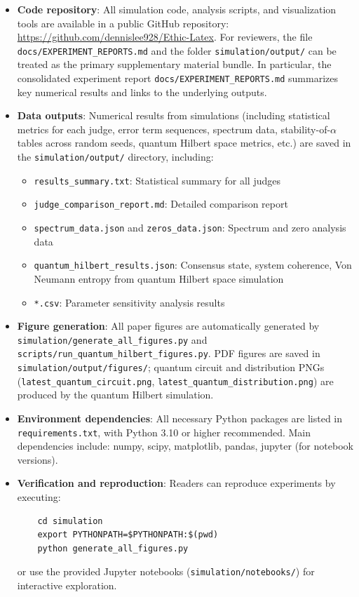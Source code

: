 \documentclass[12pt,a4paper]{article}
\theoremstyle{definition}
\theoremstyle{remark}
\begin{document}
\begin{itemize}
    \item \textbf{Code repository}: All simulation code, analysis scripts, and visualization tools are available in a public GitHub repository: \url{https://github.com/dennislee928/Ethic-Latex}. For reviewers, the file \texttt{docs/EXPERIMENT\_REPORTS.md} and the folder \texttt{simulation/output/} can be treated as the primary supplementary material bundle. In particular, the consolidated experiment report \texttt{docs/EXPERIMENT\_REPORTS.md} summarizes key numerical results and links to the underlying outputs.
    \item \textbf{Data outputs}: Numerical results from simulations (including statistical metrics for each judge, error term sequences, spectrum data, stability-of-$\alpha$ tables across random seeds, quantum Hilbert space metrics, etc.) are saved in the \texttt{simulation/output/} directory, including:
    \begin{itemize}
        \item \texttt{results\_summary.txt}: Statistical summary for all judges
        \item \texttt{judge\_comparison\_report.md}: Detailed comparison report
        \item \texttt{spectrum\_data.json} and \texttt{zeros\_data.json}: Spectrum and zero analysis data
        \item \texttt{quantum\_hilbert\_results.json}: Consensus state, system coherence, Von Neumann entropy from quantum Hilbert space simulation
        \item \texttt{*.csv}: Parameter sensitivity analysis results
    \end{itemize}
    \item \textbf{Figure generation}: All paper figures are automatically generated by \texttt{simulation/generate\_all\_figures.py} and \texttt{scripts/run\_quantum\_hilbert\_figures.py}. PDF figures are saved in \texttt{simulation/output/figures/}; quantum circuit and distribution PNGs (\texttt{latest\_quantum\_circuit.png}, \texttt{latest\_quantum\_distribution.png}) are produced by the quantum Hilbert simulation.
    \item \textbf{Environment dependencies}: All necessary Python packages are listed in \texttt{requirements.txt}, with Python 3.10 or higher recommended. Main dependencies include: numpy, scipy, matplotlib, pandas, jupyter (for notebook versions).
    \item \textbf{Verification and reproduction}: Readers can reproduce experiments by executing:
    \begin{verbatim}
    cd simulation
    export PYTHONPATH=$PYTHONPATH:$(pwd)
    python generate_all_figures.py
    \end{verbatim}
    or use the provided Jupyter notebooks (\texttt{simulation/notebooks/}) for interactive exploration.
\end{itemize}
\end{document}
